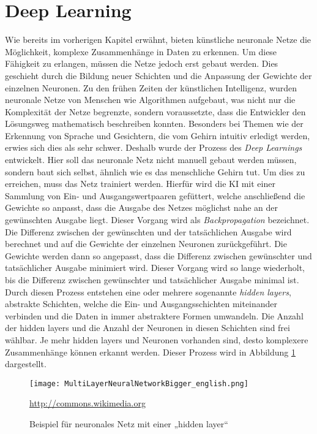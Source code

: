 \section{Deep Learning}

\noindent Wie bereits im vorherigen Kapitel erwähnt, bieten künstliche neuronale Netze die Möglichkeit, komplexe Zusammenhänge in Daten zu erkennen. Um diese Fähigkeit zu erlangen, müssen die Netze jedoch erst gebaut werden. Dies geschieht durch die Bildung neuer Schichten und die Anpassung der Gewichte der einzelnen Neuronen. Zu den frühen Zeiten der künstlichen Intelligenz, wurden neuronale Netze von Menschen wie Algorithmen aufgebaut, was nicht nur die Komplexität der Netze begrenzte, sondern voraussetzte, dass die Entwickler den Lösungsweg mathematisch beschreiben konnten. Besonders bei Themen wie der Erkennung von Sprache und Gesichtern, die vom Gehirn intuitiv erledigt werden, erwies sich dies als sehr schwer. Deshalb wurde der Prozess des \textit{Deep Learnings} entwickelt. Hier soll das neuronale Netz nicht manuell gebaut werden müssen, sondern baut sich selbst, ähnlich wie es das menschliche Gehirn tut. Um dies zu erreichen, muss das Netz trainiert werden. Hierfür wird die KI mit einer Sammlung von Ein- und Ausgangswertpaaren gefüttert, welche anschließend die Gewichte so anpasst, dass die Ausgabe des Netzes möglichst nahe an der gewünschten Ausgabe liegt. Dieser Vorgang wird als \textit{Backpropagation} bezeichnet. Die Differenz zwischen der gewünschten und der tatsächlichen Ausgabe wird berechnet und auf die Gewichte der einzelnen Neuronen zurückgeführt. Die Gewichte werden dann so angepasst, dass die Differenz zwischen gewünschter und tatsächlicher Ausgabe minimiert wird. Dieser Vorgang wird so lange wiederholt, bis die Differenz zwischen gewünschter und tatsächlicher Ausgabe minimal ist. Durch diesen Prozess entstehen eine oder mehrere sogenannte \textit{hidden layers}, abstrakte Schichten, welche die Ein- und Ausgangsschichten miteinander verbinden und die Daten in immer abstraktere Formen umwandeln. Die Anzahl der hidden layers und die Anzahl der Neuronen in diesen Schichten sind frei wählbar. Je mehr hidden layers und Neuronen vorhanden sind, desto komplexere Zusammenhänge können erkannt werden. Dieser Prozess wird in Abbildung \ref{fig:deep_learning} dargestellt.\cite{dlbook}\\

\begin{figure}[H]
    \centering
    \texttt{[image: MultiLayerNeuralNetworkBigger\_english.png]}
    \caption{Beispiel für neuronales Netz mit einer „hidden layer“} \quelle\url{http://commons.wikimedia.org}
\label{fig:deep_learning}
\end{figure}

